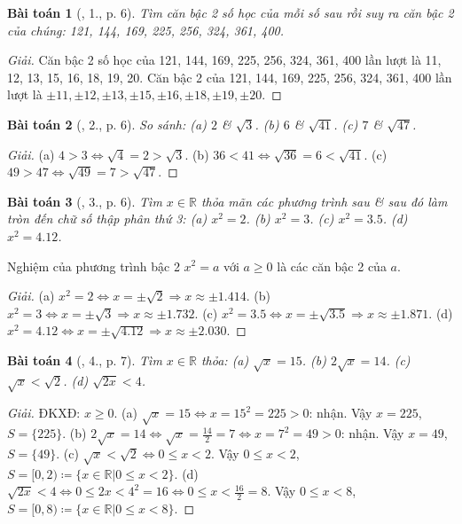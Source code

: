 \documentclass{article}
\newtheorem{baitoan}{Bài toán}
\begin{document}
\begin{baitoan}[\cite{SGK_Toan_9_tap_1}, 1., p. 6]
	Tìm căn bậc 2 số học của mỗi số sau rồi suy ra căn bậc 2 của chúng: \emph{121, 144, 169, 225, 256, 324, 361, 400}.
\end{baitoan}

\begin{proof}[Giải]
	Căn bậc 2 số học của 121, 144, 169, 225, 256, 324, 361, 400 lần lượt là 11, 12, 13, 15, 16, 18, 19, 20. Căn bậc 2 của 121, 144, 169, 225, 256, 324, 361, 400 lần lượt là $\pm11,\pm12,\pm13,\pm15,\pm16,\pm18,\pm19,\pm20$.
\end{proof}

\begin{baitoan}[\cite{SGK_Toan_9_tap_1}, 2., p. 6]
	So sánh: (a) $2$ \& $\sqrt{3}$. (b) $6$ \& $\sqrt{41}$. (c) $7$ \& $\sqrt{47}$.
\end{baitoan}

\begin{proof}[Giải]
	(a) $4 > 3\Leftrightarrow\sqrt{4} = 2 > \sqrt{3}$. (b) $36 < 41\Leftrightarrow\sqrt{36} = 6 < \sqrt{41}$. (c) $49 > 47\Leftrightarrow\sqrt{49} = 7 > \sqrt{47}$.
\end{proof}

\begin{baitoan}[\cite{SGK_Toan_9_tap_1}, 3., p. 6]
	Tìm $x\in\mathbb{R}$ thỏa mãn các phương trình sau \& sau đó làm tròn đến chữ số thập phân thứ 3: (a) $x^2 = 2$. (b) $x^2 = 3$. (c) $x^2 = 3.5$. (d) $x^2 = 4.12$.
\end{baitoan}
 Nghiệm của phương trình bậc 2 $x^2 = a$ với $a\ge0$ là các căn bậc 2 của $a$.

\begin{proof}[Giải]
	(a) $x^2 = 2\Leftrightarrow x = \pm\sqrt{2}\Rightarrow x\approx\pm1.414$. (b) $x^2 = 3\Leftrightarrow x = \pm\sqrt{3}\Rightarrow x\approx\pm1.732$. (c) $x^2 = 3.5\Leftrightarrow x = \pm\sqrt{3.5}\Rightarrow x\approx\pm1.871$. (d) $x^2 = 4.12\Leftrightarrow x = \pm\sqrt{4.12}\Rightarrow x\approx\pm2.030$.
\end{proof}

\begin{baitoan}[\cite{SGK_Toan_9_tap_1}, 4., p. 7]
	Tìm $x\in\mathbb{R}$ thỏa: (a) $\sqrt{x} = 15$. (b) $2\sqrt{x} = 14$. (c) $\sqrt{x} < \sqrt{2}$. (d) $\sqrt{2x} < 4$.
\end{baitoan}

\begin{proof}[Giải]
	ĐKXĐ: $x\ge0$. (a) $\sqrt{x} = 15\Leftrightarrow x = 15^2 = 225 > 0$: nhận. Vậy $x = 225$, $S = \{225\}$. (b) $2\sqrt{x} = 14\Leftrightarrow\sqrt{x} = \frac{14}{2} = 7\Leftrightarrow x = 7^2 = 49 > 0$: nhận. Vậy $x = 49$, $S = \{49\}$. (c) $\sqrt{x} < \sqrt{2}\Leftrightarrow0\le x < 2$. Vậy $0\le x < 2$, $S = [0,2)\coloneqq\{x\in\mathbb{R}|0\le x < 2\}$. (d) $\sqrt{2x} < 4\Leftrightarrow0\le2x < 4^2 = 16\Leftrightarrow0\le x < \frac{16}{2} = 8$. Vậy $0\le x < 8$, $S = [0,8)\coloneqq\{x\in\mathbb{R}|0\le x < 8\}$.
\end{proof}
\end{document}
